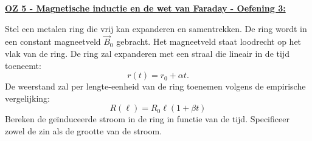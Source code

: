 \textbf{\underline{OZ 5 - Magnetische inductie en de wet van Faraday - Oefening 3:}}
\vspace{0.5cm}

Stel een metalen ring die vrij kan expanderen en samentrekken. De ring wordt in een constant magneetveld $\Vec{B}_0$ gebracht. Het magneetveld staat loodrecht op het vlak van de ring. De ring zal expanderen met een straal die lineair in de tijd toeneemt:
\begin{equation*}
    r(t) = r_0 + \alpha t.
\end{equation*}
De weerstand zal per lengte-eenheid van de ring toenemen volgens de empirische vergelijking:
\begin{equation*}
    R(\ell)  = R_{0}\ell(1 + \beta t)
\end{equation*}
Bereken de geïnduceerde stroom in de ring in functie van de tijd. Specificeer zowel de zin als de grootte van de stroom.

